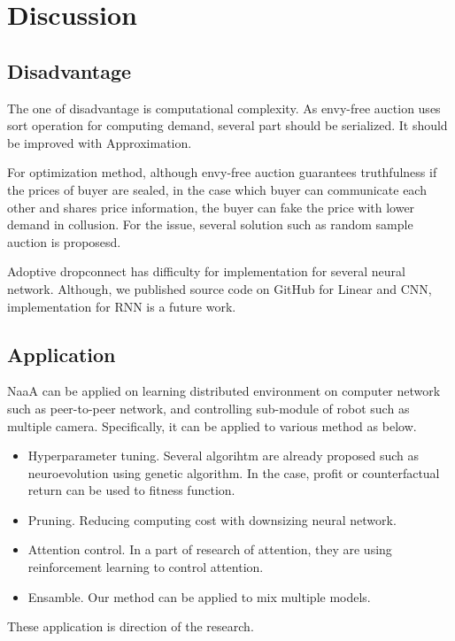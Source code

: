 \section{Discussion}
\subsection{Disadvantage}
The one of disadvantage is computational complexity.
As envy-free auction uses sort operation for computing demand,
several part should be serialized.
It should be improved with Approximation.

For optimization method,
although envy-free auction guarantees truthfulness if the prices of buyer are sealed,
in the case which buyer can communicate each other and shares price information, 
the buyer can fake the price with lower demand in collusion.
For the issue, several solution such as random sample auction \cite{goldberg2006competitive} is proposesd.

Adoptive dropconnect has difficulty for implementation for several neural network.
Although, we published source code on GitHub for Linear and CNN, 
implementation for RNN is a future work.

\subsection{Application}
NaaA can be applied on learning distributed environment on computer network such as peer-to-peer network, and controlling sub-module of robot such as multiple camera.
Specifically, it can be applied to various method as below.
\begin{itemize}
\item Hyperparameter tuning. 
Several algorihtm are already proposed such as neuroevolution using genetic algorithm.
In the case, profit or counterfactual return can be used to fitness function.

\item Pruning. Reducing computing cost with downsizing neural network.
\item Attention control. In a part of research of attention, they are using reinforcement learning to control attention.
\item Ensamble. Our method can be applied to mix multiple models.
\end{itemize}
These application is direction of the research.
